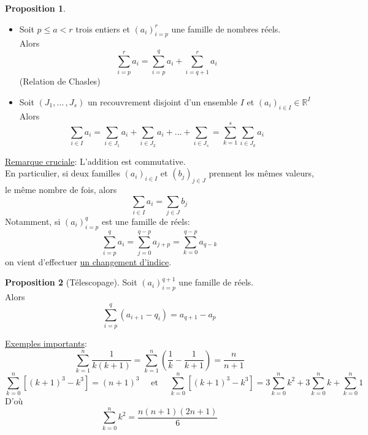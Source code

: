 \documentclass[10pt,a4paper]{article}
\theoremstyle{definition}
\newtheorem{proposition}{Proposition}[section]
\begin{document}
\begin{proposition}
\hfill
\begin{itemize}
\item Soit $p \leq a < r$ trois entiers et $(a_i)_{i = p}^r$ une famille de nombres réels. \\
Alors
\[ \sum_{i = p}^r a_i = \sum_{i = p}^q a_i + \sum_{i = q + 1}^r a_i \]
(Relation de Chasles)
\item Soit $(J_1, ...\,, J_s)$ un recouvrement disjoint d'un ensemble $I$ et $(a_i)_{i \in I} \in \mathbb{R}^I$ \\
Alors
\[\sum_{i \in I} a_i = \sum_{i \in J_1} a_i + \sum_{ i \in J_2} a_i + ... + \sum_{i \in J_s} = \sum_{k = 1}^s \sum_{i \in J_k} a_i \]
\end{itemize}
\end{proposition}
\noindent \uline{Remarque cruciale}: L'addition est commutative. \\
En particulier, si deux familles $(a_i)_{i \in I}$ et $(b_j)_{j \in J}$ prennent les mêmes valeurs, le même nombre de fois, alors
\[ \sum_{i \in I} a_i = \sum_{j \in J} b_j \]
Notamment, si $(a_i)_{i = p}^q$ est une famille de réels:
\[ \sum_{i = p}^q a_i = \sum_{j = 0}^{q - p} a_{j + p} = \sum_{k = 0}^{q - p} a_{q - k} \]
on vient d'effectuer \uline{un changement d'indice}.
\begin{proposition}[Télescopage]
Soit $(a_i)_{i = p}^{q + 1}$ une famille de réels. \\
Alors
\[ \sum_{i = p}^q (a_{i + 1} - q_i) = a_{q + 1} - a_p \]
\end{proposition}
\noindent \uline{Exemples importants}:
\[ \sum_{k = 1}^n \frac{1}{k(k + 1)} = \sum_{k = 1}^n \left(\frac{1}{k} - \frac{1}{k + 1}\right) = \frac{n}{n + 1} \]
\[ \sum_{k = 0}^n [(k + 1)^3 - k^3] = (n + 1)^3 \quad \text{ et } \quad \sum_{k = 0}^n [(k + 1)^3 - k^3] = 3\sum_{k = 0}^n k^2 + 3\sum_{k = 0}^n k + \sum_{k = 0}^n 1 \]
D'où
\[ \sum_{k = 0}^n k^2 = \frac{n(n+1)(2n + 1)}{6} \]
\end{document}
